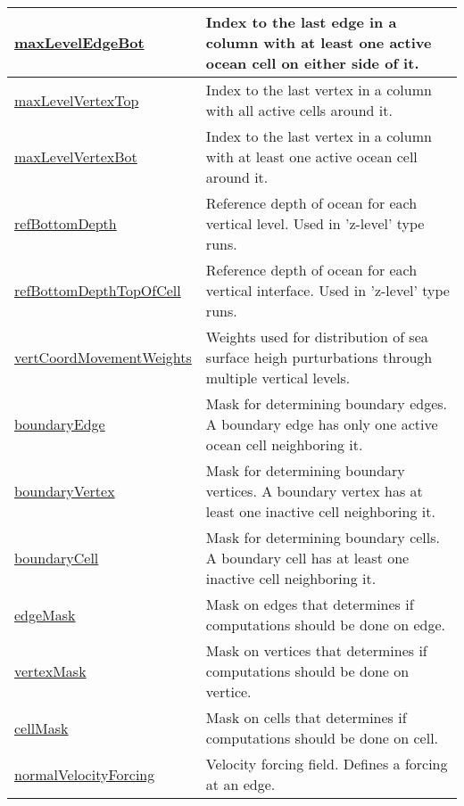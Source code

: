 {\begin{center}
\begin{longtable}{| p{2.0in} | p{4.0in} |}
	\hline
	\hyperref[subsec:var_sec_mesh_maxLevelEdgeBot]{maxLevelEdgeBot} & Index to the last edge in a column with at least one active ocean cell on either side of it. \\
	\hline
	\hyperref[subsec:var_sec_mesh_maxLevelVertexTop]{maxLevelVertexTop} & Index to the last vertex in a column with all active cells around it. \\
	\hline
	\hyperref[subsec:var_sec_mesh_maxLevelVertexBot]{maxLevelVertexBot} & Index to the last vertex in a column with at least one active ocean cell around it. \\
	\hline
	\hyperref[subsec:var_sec_mesh_refBottomDepth]{refBottomDepth} & Reference depth of ocean for each vertical level. Used in 'z-level' type runs. \\
	\hline
	\hyperref[subsec:var_sec_mesh_refBottomDepthTopOfCell]{refBottomDepthTopOfCell} & Reference depth of ocean for each vertical interface. Used in 'z-level' type runs. \\
	\hline
	\hyperref[subsec:var_sec_mesh_vertCoordMovementWeights]{vertCoordMovementWeights} & Weights used for distribution of sea surface heigh purturbations through multiple vertical levels. \\
	\hline
	\hyperref[subsec:var_sec_mesh_boundaryEdge]{boundaryEdge} & Mask for determining boundary edges. A boundary edge has only one active ocean cell neighboring it. \\
	\hline
	\hyperref[subsec:var_sec_mesh_boundaryVertex]{boundaryVertex} & Mask for determining boundary vertices. A boundary vertex has at least one inactive cell neighboring it. \\
	\hline
	\hyperref[subsec:var_sec_mesh_boundaryCell]{boundaryCell} & Mask for determining boundary cells. A boundary cell has at least one inactive cell neighboring it. \\
	\hline
	\hyperref[subsec:var_sec_mesh_edgeMask]{edgeMask} & Mask on edges that determines if computations should be done on edge. \\
	\hline
	\hyperref[subsec:var_sec_mesh_vertexMask]{vertexMask} & Mask on vertices that determines if computations should be done on vertice. \\
	\hline
	\hyperref[subsec:var_sec_mesh_cellMask]{cellMask} & Mask on cells that determines if computations should be done on cell. \\
	\hline
	\hyperref[subsec:var_sec_mesh_normalVelocityForcing]{normalVelocityForcing} & Velocity forcing field. Defines a forcing at an edge. \\

\end{longtable}
\end{center}}
